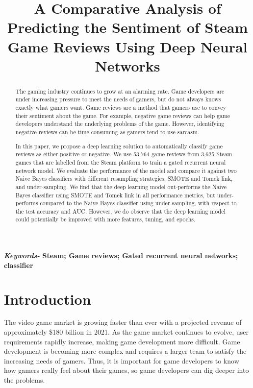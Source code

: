 \documentclass[conference]{IEEEtran}
\begin{document}
\title{A Comparative Analysis of Predicting the Sentiment of Steam Game Reviews Using Deep Neural Networks}




\author{
}

\maketitle

\begin{abstract}
	The gaming industry continues to grow at an alarming rate. Game developers are under increasing pressure to meet the needs of gamers, but do not always knows exactly what gamers want. Game reviews are a method that gamers use to convey their sentiment about the game. For example, negative game reviews can help game developers understand the underlying problems of the game. However, identifying negative reviews can be time consuming as gamers tend to use sarcasm. 
		
	In this paper, we propose a deep learning solution to automatically classify game reviews as either positive or negative. We use 53,764 game reviews from 3,625 Steam games that are labelled from the Steam platform to train a gated recurrent neural network model. We evaluate the performance of the model and compare it against two Naive Bayes classifiers with different resampling strategies; SMOTE and Tomek link, and under-sampling. We find that the deep learning model out-performs the Naive Bayes classifier using SMOTE and Tomek link in all performance metrics, but under-performs compared to the Naive Bayes classifier using under-sampling, with respect to the test accuracy and AUC. However, we do observe that the deep learning model could potentially be improved with more features, tuning, and epochs.
\end{abstract}
\textbf{\textit{Keywords-} Steam; Game reviews; Gated recurrent neural networks; classifier}

\section{Introduction}
\label{sec:intro}
The video game market is growing faster than ever with a projected revenue of approximately \$180 billion in 2021. As the game market continues to evolve, user requirements rapidly increase, making game development more difficult. Game development is becoming more complex and requires a larger team to satisfy the increasing needs of gamers. Thus, it is important for game developers to know how gamers really feel about their games, so game developers can dig deeper into the problems.
\end{document}
